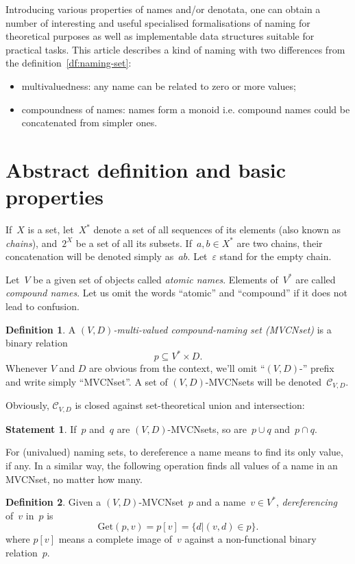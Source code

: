 \documentclass{article}
\theoremstyle{definition}
\newtheorem{Df}{Definition}
\newtheorem{St}{Statement}
\newcommand{\setcharmvcn}{C}
\newcommand{\setsymbol}[3]{\mathcal{#1}_{#2,#3}}
\newcommand{\setmvcn}[2]{\setsymbol{\setcharmvcn}{#1}{#2}}
\newcommand{\deref}[2]{\mathrm{Get}(#1, #2)}
\begin{document}
Introducing various properties of names and/or denotata, one can obtain a
number of interesting and useful specialised formalisations of naming for
theoretical purposes as well as implementable data structures suitable for
practical tasks. This article describes a kind of naming with
two differences from the definition~\ref{df:naming-set}:
\begin{itemize}
\item multivaluedness: any name can be related to zero or more values;
\item compoundness of names: names form a monoid i.e. compound names could
be concatenated from simpler ones.
\end{itemize}


\section{Abstract definition and basic properties}

If~$X$ is a set, let~$X^\ast$ denote a set of all sequences of its elements
(also known as \emph{chains}), and~$2^X$ be a set of all its subsets.
If~$a,b\in X^\ast$ are two chains, their concatenation will be denoted simply
as~$ab$. Let~$\varepsilon$ stand for the empty chain.

Let~$V$ be a given set of objects called \emph{atomic names}. Elements
of~$V^\ast$ are called \emph{compound names}. Let us omit the words ``atomic''
and ``compound'' if it does not lead to confusion.

\begin{Df}\label{df:mvcn}
A \emph{$(V,D)$-multi-valued compound-naming set (MVCNset)} is a binary
relation
\[
  p \subseteq V^\ast \times D .
\]
Whenever $V$ and $D$ are obvious from the context, we'll omit ``$(V,D)$-''
prefix and write simply ``MVCNset''. A set of $(V,D)$-MVCNsets will be
denoted~$\setmvcn{V}{D}$.
\end{Df}

Obviously, $\setmvcn{V}{D}$ is closed against set-theoretical union
and intersection:
\begin{St}\label{st:mvcn-closedness}
If~$p$ and~$q$ are $(V,D)$-MVCNsets, so are~$p\cup q$ and~$p\cap q$.
\end{St}

For (univalued) naming sets, to dereference a name means to find its only
value, if any.  In a similar way, the following operation finds all values
of a name in an MVCNset, no matter how many.

\begin{Df}\label{df:mvcn-dereferencing}
Given a $(V,D)$-MVCNset~$p$ and a name~$v\in V^\ast$, \emph{dereferencing}
of~$v$ in~$p$ is
\[
  \deref{p}{v} = p[v] = \{ d | (v, d) \in p \} .
\]
where $p[v]$ means a complete image of~$v$ against a non-functional binary
relation~$p$.
\end{Df}
\end{document}
